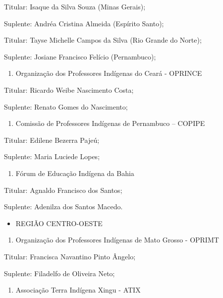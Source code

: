 \documentclass[
]{book}
\providecommand{\tightlist}{%
  \setlength{\itemsep}{0pt}\setlength{\parskip}{0pt}}
\begin{document}
Titular: Isaque da Silva Souza (Minas Gerais);

Suplente: Andréa Cristina Almeida (Espírito Santo);

Titular: Tayse Michelle Campos da Silva (Rio Grande do Norte);

Suplente: Josiane Francisco Felício (Pernambuco);

\begin{enumerate}
\def\labelenumi{\alph{enumi})}
\setcounter{enumi}{1}
\tightlist
\item
  Organização dos Professores Indígenas do Ceará - OPRINCE
\end{enumerate}

Titular: Ricardo Weibe Nascimento Costa;

Suplente: Renato Gomes do Nascimento;

\begin{enumerate}
\def\labelenumi{\alph{enumi})}
\setcounter{enumi}{2}
\tightlist
\item
  Comissão de Professores Indígenas de Pernambuco -- COPIPE
\end{enumerate}

Titular: Edilene Bezerra Pajeú;

Suplente: Maria Luciede Lopes;

\begin{enumerate}
\def\labelenumi{\alph{enumi})}
\setcounter{enumi}{3}
\tightlist
\item
  Fórum de Educação Indígena da Bahia
\end{enumerate}

Titular: Agnaldo Francisco dos Santos;

Suplente: Adenilza dos Santos Macedo.

\begin{itemize}
\tightlist
\item
  REGIÃO CENTRO-OESTE
\end{itemize}

\begin{enumerate}
\def\labelenumi{\alph{enumi})}
\tightlist
\item
  Organização dos Professores Indígenas de Mato Grosso - OPRIMT
\end{enumerate}

Titular: Francisca Navantino Pinto Ângelo;

Suplente: Filadelfo de Oliveira Neto;

\begin{enumerate}
\def\labelenumi{\alph{enumi})}
\setcounter{enumi}{1}
\tightlist
\item
  Associação Terra Indígena Xingu - ATIX
\end{enumerate}
\end{document}

